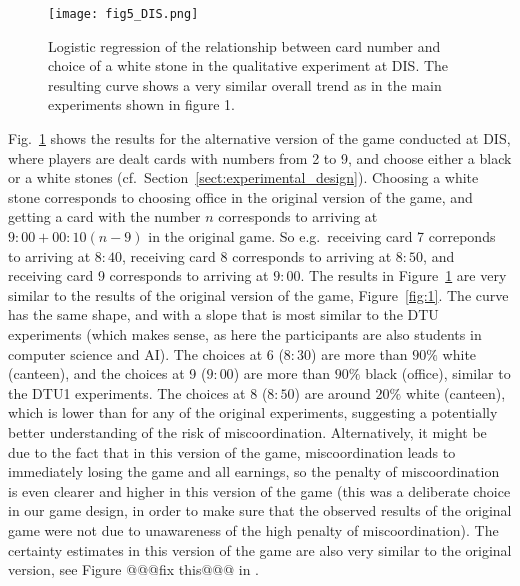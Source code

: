 \begin{figure} %
  \centering\texttt{[image: fig5\_DIS.png]}
  \caption{Logistic regression of the relationship between card number and choice of a white stone in the qualitative experiment at DIS. The resulting curve shows a very similar overall trend as in the main experiments shown in figure 1.}
  \label{fig:dis}
  \end{figure}  
Fig.~\ref{fig:dis} shows the results for the alternative version of the game conducted at DIS, where players are dealt cards with numbers from 2 to 9, and choose either a black or a white stones (cf.\ Section~\ref{sect:experimental_design}). Choosing a white stone corresponds to choosing office in the original version of the game, and getting a card with the number $n$ corresponds to arriving at $9{:}00+00{:}10(n-9)$ in the original game. So e.g.\ receiving card 7 correponds to arriving at $8{:}40$, receiving card 8 corresponds to arriving at $8{:}50$, and receiving card 9 corresponds to arriving at $9{:}00$. The results in Figure~\ref{fig:dis} are very similar to the results of the original version of the game, Figure~\ref{fig:1}. The curve has the same shape, and with a slope that is most similar to the DTU experiments (which makes sense, as here the participants are also students in computer science and AI). The choices at 6 ($8{:}30$) are more than $90\%$ white (canteen), and the choices at 9 ($9{:}00$) are more than $90\%$ black (office), similar to the DTU1 experiments. The choices at 8 ($8{:}50$) are around $20\%$ white (canteen), which is lower than for any of the original experiments, suggesting a potentially better understanding of the risk of miscoordination. Alternatively, it might be due to the fact that in this version of the game, miscoordination leads to immediately losing the game and all earnings, so the penalty of miscoordination is even clearer and higher in this version of the game (this was a deliberate choice in our game design, in order to make sure that the observed results of the original game were not due to unawareness of the high penalty of miscoordination). The certainty estimates in this version of the game are also very similar to the original version, see Figure
@@@fix this@@@ in  .

